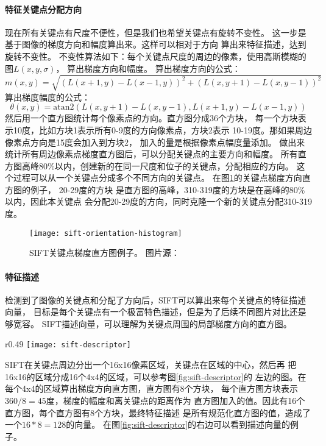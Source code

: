 \paragraph*{特征关键点分配方向}
现在所有关键点有尺度不便性，但是我们也希望关键点有旋转不变性。
这一步是基于图像的梯度方向和幅度算出来。这样可以相对于方向
算出来特征描述，达到旋转不变性。
不变性算法如下：每个关键点尺度的周边的像素，使用高斯模糊的图$L \left( x, y, \sigma \right)$，
算出梯度方向和幅度。
算出梯度方向的公式：$$m \left( x, y \right) = \sqrt{\left( L \left( x+1, y \right) - L \left( x-1, y \right) \right)^2 
                  + \left( L \left( x, y+1 \right) - L \left( x, y-1 \right) \right)^2}$$
算出梯度幅度的公式：$$\theta \left( x, y \right) = \mathrm{atan2}\left(L \left( x, y+1 \right) - L \left( x, y-1 \right),
               L \left( x+1, y \right) - L \left( x-1, y \right) \right)$$
然后用一个直方图统计每个像素点的方向。直方图分成36个方块，
每一个方块表示10度，比如方块1表示所有0-9度的方向像素点，方块2表示
10-19度。那如果周边像素点方向是15度会加入到方块2，
加入的量是根据像素点幅度量添加。
做出来统计所有周边像素点梯度直方图后，可以分配关键点的主要方向和幅度。
所有直方图高峰80\%以内，创建新的在同一尺度和位子的关键点，分配相应的方向。
这个过程可以从一个关键点分成多个不同方向的关键点。
在图\ref{fig:sift-orientation-histogram}的关键点梯度方向直方图的例子，
20-29度的方块 是直方图的高峰，310-319度的方块是在高峰的80\%以内，因此本关键点
会分配20-29度的方向，同时克隆一个新的关键点分配310-319度。
\begin{figure}
  \centering
    \texttt{[image: sift-orientation-histogram]}
    \caption{SIFT关键点梯度直方图例子。
             图片源：\cite{aishack:sift-orientation}}
  \label{fig:sift-orientation-histogram}
\end{figure}


\paragraph*{特征描述}
检测到了图像的关键点和分配了方向后，SIFT可以算出来每个关键点的特征描述向量，
目标是每个关键点有一个极富特色描述，但是为了后续不同图片对比还是够宽容。
SIFT描述向量，可以理解为关键点周围的局部梯度方向的直方图。

\begin{wrapfigure}{r}{0.49\textwidth}
  \centering
    \texttt{[image: sift-descriptor]}
    \caption{SIFT特征描述。源：Cornell CS664}
  \label{fig:sift-descriptor}
\end{wrapfigure}
SIFT在关键点周边分出一个16x16像素区域，关键点在区域的中心，然后再
把16x16的区域分成16个4x4的区域，可以参考图\ref{fig:sift-descriptor}的
左边的图。在每个4x4的区域算出梯度方向直方图，直方图有8个方块，
每个直方图方块表示$360 / 8 = 45$度，梯度的幅度和离关键点的距离作为
直方图加入的值。因此有16个直方图，每个直方图有8个方块，最终特征描述
是所有规范化直方图的值，造成了一个$16 * 8 = 128$的向量。
在图\ref{fig:sift-descriptor}的右边可以看到描述向量的例子。


